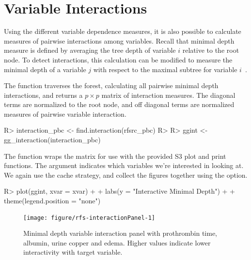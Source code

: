 \documentclass[nojss]{jss}\usepackage[]{graphicx}\usepackage[]{color}
\begin{document}
\section{Variable Interactions}\label{S:interactions}

Using the different variable dependence measures, it is also possible to calculate measures of pairwise interactions among variables. Recall that minimal depth measure is defined by averaging the tree depth of variable $i$ relative to the root node. To detect interactions, this calculation can be modified to measure the minimal depth of a variable $j$ with respect to the maximal subtree for variable $i$~\citep{Ishwaran:2010,Ishwaran:2011}.

The  function traverses the forest, calculating all pairwise minimal depth interactions, and returns a $p \times p$ matrix of interaction measures. The diagonal terms are normalized to the root node, and off diagonal terms are normalized measures of pairwise variable interaction. 

\begin{Schunk}
\begin{Sinput}
R> interaction_pbc <- find.interaction(rfsrc_pbc)
R> 
R> ggint <- gg_interaction(interaction_pbc)
\end{Sinput}
\end{Schunk}



The  function wraps the  matrix for use with the provided S3 plot and print functions. The  argument indicates which variables we're interested in looking at. We again use the cache strategy, and collect the figures together using the  option.

\begin{Schunk}
\begin{Sinput}
R> plot(ggint, xvar = xvar) + 
+   labs(y = "Interactive Minimal Depth") + 
+   theme(legend.position = "none")
\end{Sinput}
\begin{figure}[!htpb]

{\centering \texttt{[image: figure/rfs-interactionPanel-1]} 

}

\caption[Minimal depth variable interaction panel with prothrombin time, albumin, urine copper and edema]{Minimal depth variable interaction panel with prothrombin time, albumin, urine copper and edema. Higher values indicate lower interactivity with target variable.\label{fig:interactionPanel}}
\end{figure}
\end{Schunk}
\end{document}
